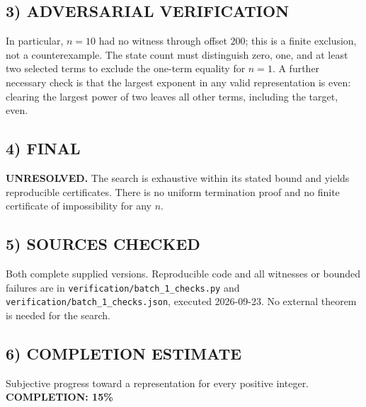 \subsection*{3) ADVERSARIAL VERIFICATION}
In particular, $n=10$ had no witness through offset $200$; this is a finite exclusion, not a counterexample. The state count must distinguish zero, one, and at least two selected terms to exclude the one-term equality for $n=1$. A further necessary check is that the largest exponent in any valid representation is even: clearing the largest power of two leaves all other terms, including the target, even.
\subsection*{4) FINAL}
\textbf{UNRESOLVED.} The search is exhaustive within its stated bound and yields reproducible certificates. There is no uniform termination proof and no finite certificate of impossibility for any $n$.
\subsection*{5) SOURCES CHECKED}
Both complete supplied versions. Reproducible code and all witnesses or bounded failures are in \texttt{verification/batch\_1\_checks.py} and \texttt{verification/batch\_1\_checks.json}, executed 2026-09-23. No external theorem is needed for the search.
\subsection*{6) COMPLETION ESTIMATE}
Subjective progress toward a representation for every positive integer.
\textbf{COMPLETION: 15\%}
